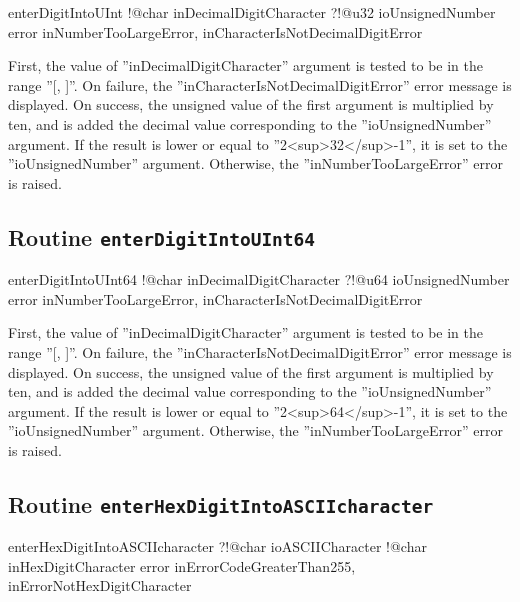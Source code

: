 \begin{galgas4}
enterDigitIntoUInt !@char inDecimalDigitCharacter
                   ?!@u32 ioUnsignedNumber
                   error inNumberTooLargeError,
                         inCharacterIsNotDecimalDigitError
\end{galgas4}

First, the value of ''inDecimalDigitCharacter'' argument is tested to be in the range ''[\textquotesingle, \textquotesingle]''. On failure, the ''inCharacterIsNotDecimalDigitError'' error message is displayed. On success, the unsigned value of the first argument is multiplied by ten, and is added the decimal value corresponding to the ''ioUnsignedNumber'' argument. If the result is lower or equal to ''2<sup>32</sup>-1'', it is set to the ''ioUnsignedNumber'' argument. Otherwise, the ''inNumberTooLargeError'' error is raised.

\subsection{Routine \texttt{enterDigitIntoUInt64}}

\begin{galgas4}
enterDigitIntoUInt64 !@char inDecimalDigitCharacter
                     ?!@u64 ioUnsignedNumber
                     error inNumberTooLargeError,
                           inCharacterIsNotDecimalDigitError
\end{galgas4}

First, the value of ''inDecimalDigitCharacter'' argument is tested to be in the range ''[\textquotesingle, \textquotesingle]''. On failure, the ''inCharacterIsNotDecimalDigitError'' error message is displayed. On success, the unsigned value of the first argument is multiplied by ten, and is added the decimal value corresponding to the ''ioUnsignedNumber'' argument. If the result is lower or equal to ''2<sup>64</sup>-1'', it is set to the ''ioUnsignedNumber'' argument. Otherwise, the ''inNumberTooLargeError'' error is raised.

\subsection{Routine \texttt{enterHexDigitIntoASCIIcharacter}}

\begin{galgas4}
enterHexDigitIntoASCIIcharacter ?!@char ioASCIICharacter
                                !@char inHexDigitCharacter
                                error inErrorCodeGreaterThan255,
                                      inErrorNotHexDigitCharacter
\end{galgas4}

